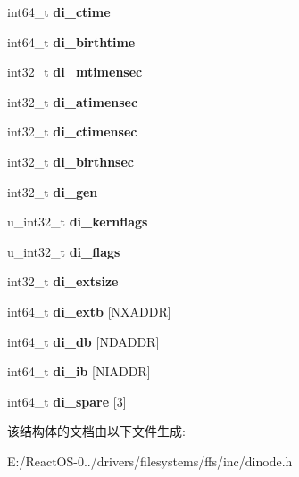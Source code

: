 \begin{DoxyCompactItemize}
\mbox{\label{structufs2__dinode_a42c746c07920376c83e5dc371a00fbf8}} 
int64\+\_\+t {\bfseries di\+\_\+ctime}
\item 
\mbox{\label{structufs2__dinode_aaea3ec643e2b0b98ef1c2ff0654493fe}} 
int64\+\_\+t {\bfseries di\+\_\+birthtime}
\item 
\mbox{\label{structufs2__dinode_a6aa493a9beb9514ce29fab46c4dd9de2}} 
int32\+\_\+t {\bfseries di\+\_\+mtimensec}
\item 
\mbox{\label{structufs2__dinode_af66b1f8d1a7a8a8eeac1dceba64582f7}} 
int32\+\_\+t {\bfseries di\+\_\+atimensec}
\item 
\mbox{\label{structufs2__dinode_a264013dc040d9a1a4f940948bd78306d}} 
int32\+\_\+t {\bfseries di\+\_\+ctimensec}
\item 
\mbox{\label{structufs2__dinode_aa62f9cdee1b9d4f5b437e3fbd6dcc33a}} 
int32\+\_\+t {\bfseries di\+\_\+birthnsec}
\item 
\mbox{\label{structufs2__dinode_a4381e2835270fbbe32040beccd49453c}} 
int32\+\_\+t {\bfseries di\+\_\+gen}
\item 
\mbox{\label{structufs2__dinode_a999f1d6844c5076d417dcd7eefd0c853}} 
u\+\_\+int32\+\_\+t {\bfseries di\+\_\+kernflags}
\item 
\mbox{\label{structufs2__dinode_a679f34fcac6376db0f8307194a31de00}} 
u\+\_\+int32\+\_\+t {\bfseries di\+\_\+flags}
\item 
\mbox{\label{structufs2__dinode_aebd41a6fb817a7a04b6cf9664c5fc1dd}} 
int32\+\_\+t {\bfseries di\+\_\+extsize}
\item 
\mbox{\label{structufs2__dinode_a1890c9161b09779e62539691abfb23e3}} 
int64\+\_\+t {\bfseries di\+\_\+extb} \mbox{[}N\+X\+A\+D\+DR\mbox{]}
\item 
\mbox{\label{structufs2__dinode_a493f0d3ad44b266acff8748df175b40a}} 
int64\+\_\+t {\bfseries di\+\_\+db} \mbox{[}N\+D\+A\+D\+DR\mbox{]}
\item 
\mbox{\label{structufs2__dinode_a96f1d02b8ab5194f313868912564d0cd}} 
int64\+\_\+t {\bfseries di\+\_\+ib} \mbox{[}N\+I\+A\+D\+DR\mbox{]}
\item 
\mbox{\label{structufs2__dinode_af548961233457327ec8ae47cba34faed}} 
int64\+\_\+t {\bfseries di\+\_\+spare} \mbox{[}3\mbox{]}
\end{DoxyCompactItemize}


该结构体的文档由以下文件生成\+:\begin{DoxyCompactItemize}
\item 
E\+:/\+React\+O\+S-\/0../drivers/filesystems/ffs/inc/dinode.\+h\end{DoxyCompactItemize}
